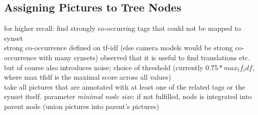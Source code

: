\subsection{Assigning Pictures to Tree Nodes}
for higher recall: find strongly co-occurring tags that could not be mapped to synset \\
strong co-occurrence defined on tf-idf (else camera models would be strong co-occurrence with many synsets)
observed that it is useful to find translations etc. but of course also introduces noise; choice of threshold (currently $0.75 * max_tf_idf$, where max tfidf is the maximal score across all values) \\
take all pictures that are annotated with at least one of the related tags or the synset itself. parameter \emph{minimal node size}: if not fulfilled, node is integrated into parent node (union pictures into parent's pictures)
